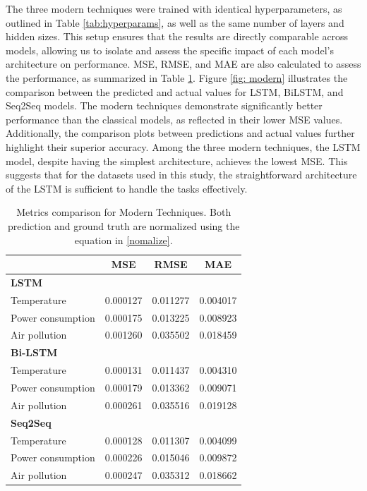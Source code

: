 \documentclass{scrartcl}
\begin{document}
The three modern techniques were trained with identical hyperparameters, as outlined in Table \ref{tab:hyperparams}, as well as the same number of layers and hidden sizes. This setup ensures that the results are directly comparable across models, allowing us to isolate and assess the specific impact of each model’s architecture on performance.  MSE, RMSE, and MAE are also calculated to assess the performance, as summarized in Table \ref{tab:lstm_metric}. Figure \ref{fig: modern} illustrates the comparison between the predicted and actual values for LSTM, BiLSTM, and Seq2Seq models. The modern techniques demonstrate significantly better performance than the classical models, as reflected in their lower MSE values. Additionally, the comparison plots between predictions and actual values further highlight their superior accuracy. Among the three modern techniques, the LSTM model, despite having the simplest architecture, achieves the lowest MSE. This suggests that for the datasets used in this study, the straightforward architecture of the LSTM is sufficient to handle the tasks effectively.

\begin{table}[h!]
\centering
\begin{tabular}{@{}lccc@{}}
\toprule
\textbf{}               & \textbf{MSE} & \textbf{RMSE} & \textbf{MAE} \\ \midrule
\textbf{LSTM}           &              &               &              \\
Temperature             & 0.000127     & 0.011277      & 0.004017     \\
Power consumption       & 0.000175     & 0.013225      & 0.008923     \\
Air pollution           & 0.001260     & 0.035502      & 0.018459     \\ \midrule
\textbf{Bi-LSTM}        &              &               &              \\
Temperature             & 0.000131     & 0.011437      & 0.004310     \\
Power consumption       & 0.000179     & 0.013362      & 0.009071     \\
Air pollution           & 0.000261     & 0.035516      & 0.019128     \\ \midrule
\textbf{Seq2Seq}        &              &               &              \\
Temperature             & 0.000128     & 0.011307      & 0.004099     \\
Power consumption       & 0.000226     & 0.015046      & 0.009872     \\
Air pollution           & 0.000247     & 0.035312      & 0.018662       \\ \bottomrule
\end{tabular}
\caption{Metrics comparison for Modern Techniques. Both prediction and ground truth are normalized using the equation in \ref{nomalize}.}
\label{tab:lstm_metric}
\end{table}
\end{document}
